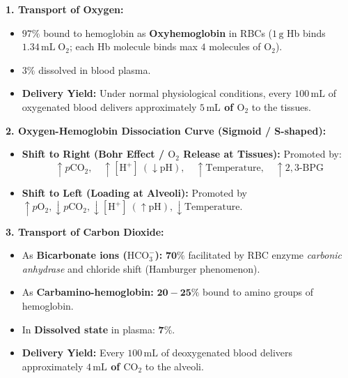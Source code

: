 \documentclass[10pt,a4paper]{article}
\begin{document}
\begin{conceptbox}
\textbf{1. Transport of Oxygen:}
\begin{itemize}
  \item $97\%$ bound to hemoglobin as \textbf{Oxyhemoglobin} in RBCs ($1\,\mathrm{g}$ Hb binds $1.34\,\mathrm{mL}\; \mathrm{O}_2$; each Hb molecule binds max $4$ molecules of $\mathrm{O}_2$).
  \item $3\%$ dissolved in blood plasma.
  \item \textbf{Delivery Yield:} Under normal physiological conditions, every $100\,\mathrm{mL}$ of oxygenated blood delivers approximately \textbf{$5\,\mathrm{mL}$ of $\mathrm{O}_2$} to the tissues.
\end{itemize}
\textbf{2. Oxygen-Hemoglobin Dissociation Curve (Sigmoid / S-shaped):}
\begin{itemize}
  \item \textbf{Shift to Right (Bohr Effect / $\mathrm{O}_2$ Release at Tissues):} Promoted by:
  \begin{equation}
    \uparrow p\mathrm{CO_2}, \quad \uparrow [\mathrm{H}^+] \ (\downarrow \mathrm{pH}), \quad \uparrow \text{Temperature}, \quad \uparrow 2,3\text{-BPG}
  \end{equation}
  \item \textbf{Shift to Left (Loading at Alveoli):} Promoted by $\uparrow p\mathrm{O_2}, \downarrow p\mathrm{CO_2}, \downarrow [\mathrm{H}^+] \ (\uparrow \mathrm{pH}), \downarrow \text{Temperature}$.
\end{itemize}
\textbf{3. Transport of Carbon Dioxide:}
\begin{itemize}
  \item As \textbf{Bicarbonate ions ($\mathrm{HCO}_3^-$):} $\mathbf{70\%}$ facilitated by RBC enzyme \textit{carbonic anhydrase} and chloride shift (Hamburger phenomenon).
  \item As \textbf{Carbamino-hemoglobin:} $\mathbf{20-25\%}$ bound to amino groups of hemoglobin.
  \item In \textbf{Dissolved state} in plasma: $\mathbf{7\%}$.
  \item \textbf{Delivery Yield:} Every $100\,\mathrm{mL}$ of deoxygenated blood delivers approximately \textbf{$4\,\mathrm{mL}$ of $\mathrm{CO}_2$} to the alveoli.
\end{itemize}
\end{conceptbox}
\end{document}
